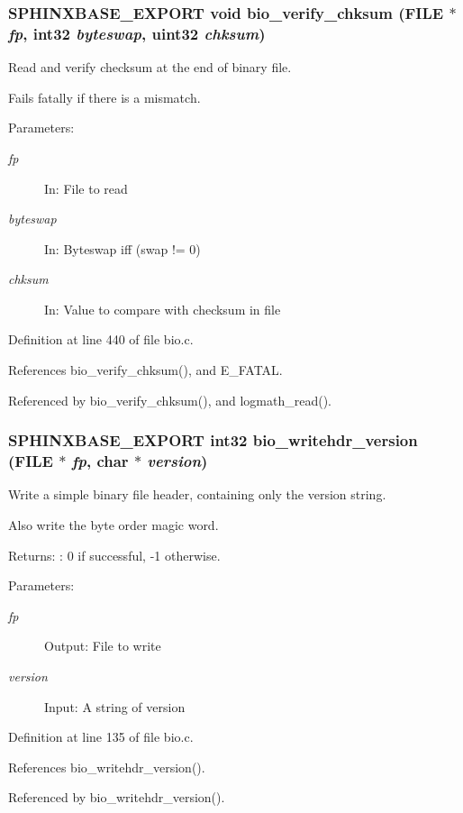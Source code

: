 \subsubsection[{bio\_\-verify\_\-chksum}]{\setlength{\rightskip}{0pt plus 5cm}SPHINXBASE\_\-EXPORT void bio\_\-verify\_\-chksum (FILE $\ast$ {\em fp}, \/  int32 {\em byteswap}, \/  uint32 {\em chksum})}\label{bio_8h_d07e2ee9f2f01d3ff3232008098295a0}


Read and verify checksum at the end of binary file. 

Fails fatally if there is a mismatch. \begin{Desc}
\item[Parameters: ]\par
\begin{description}
\item[{\em 
fp}]In: File to read \item[{\em 
byteswap}]In: Byteswap iff (swap != 0) \item[{\em 
chksum}]In: Value to compare with checksum in file \end{description}
\end{Desc}


Definition at line 440 of file bio.c.

References bio\_\-verify\_\-chksum(), and E\_\-FATAL.

Referenced by bio\_\-verify\_\-chksum(), and logmath\_\-read().
\subsubsection[{bio\_\-writehdr\_\-version}]{\setlength{\rightskip}{0pt plus 5cm}SPHINXBASE\_\-EXPORT int32 bio\_\-writehdr\_\-version (FILE $\ast$ {\em fp}, \/  char $\ast$ {\em version})}\label{bio_8h_9662c09be1f18377488dedb8e7ca0bfd}


Write a simple binary file header, containing only the version string. 

Also write the byte order magic word. \begin{Desc}
\item[Returns:]: 0 if successful, -1 otherwise. \end{Desc}
\begin{Desc}
\item[Parameters: ]\par
\begin{description}
\item[{\em 
fp}]Output: File to write \item[{\em 
version}]Input: A string of version \end{description}
\end{Desc}


Definition at line 135 of file bio.c.

References bio\_\-writehdr\_\-version().

Referenced by bio\_\-writehdr\_\-version().